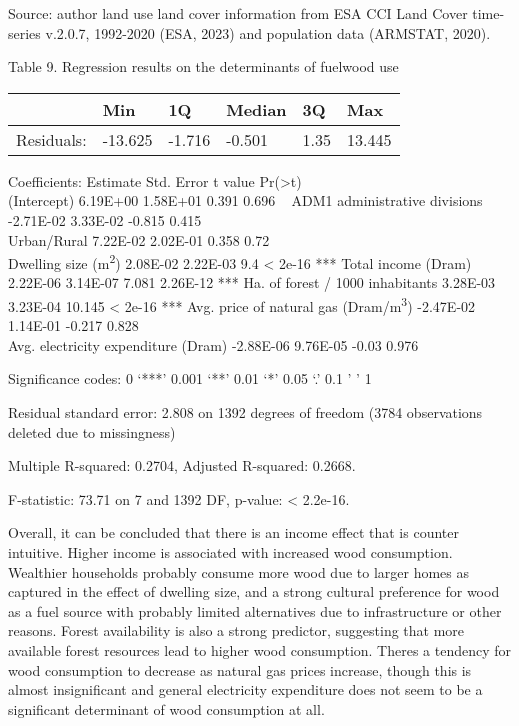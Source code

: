 \documentclass[
  letterpaper,
  DIV=11,
  numbers=noendperiod]{scrartcl}
\begin{document}
Source: author land use land cover information from ESA CCI Land Cover
time-series v.2.0.7, 1992-2020 (ESA, 2023) and population data (ARMSTAT,
2020).

\label{_Ref154854194}{}Table 9. Regression results on the
determinants of fuelwood use

\begin{longtable}[]{@{}llllll@{}}
\toprule\noalign{}
& Min & 1Q & Median & 3Q & Max \\
\midrule\noalign{}
\endhead
\bottomrule\noalign{}
\endlastfoot
Residuals: & -13.625 & -1.716 & -0.501 & 1.35 & 13.445 \\
\end{longtable}

Coefficients: Estimate Std. Error t value
Pr(\textgreater\textbar t\textbar)\\
(Intercept) 6.19E+00 1.58E+01 0.391 0.696 ~ ADM1 administrative
divisions -2.71E-02 3.33E-02 -0.815 0.415\\
Urban/Rural 7.22E-02 2.02E-01 0.358 0.72\\
Dwelling size (m\textsuperscript{2}) 2.08E-02 2.22E-03 9.4 \textless{}
2e-16 *** Total income (Dram) 2.22E-06 3.14E-07 7.081 2.26E-12 *** Ha.
of forest / 1000 inhabitants 3.28E-03 3.23E-04 10.145 \textless{} 2e-16
*** Avg. price of natural gas (Dram/m\textsuperscript{3}) -2.47E-02
1.14E-01 -0.217 0.828\\
Avg. electricity expenditure (Dram) -2.88E-06 9.76E-05 -0.03 0.976 ~

Significance codes: 0 `***' 0.001 `**' 0.01 `*' 0.05 `.' 0.1 ' ' 1

Residual standard error: 2.808 on 1392 degrees of freedom (3784
observations deleted due to missingness)

Multiple R-squared: 0.2704, Adjusted R-squared: 0.2668.

F-statistic: 73.71 on 7 and 1392 DF, p-value: \textless{} 2.2e-16.

Overall, it can be concluded that there is an income effect that is
counter intuitive. Higher income is associated with increased wood
consumption. Wealthier households probably consume more wood due to
larger homes as captured in the effect of dwelling size, and a strong
cultural preference for wood as a fuel source with probably limited
alternatives due to infrastructure or other reasons. Forest availability
is also a strong predictor, suggesting that more available forest
resources lead to higher wood consumption. There\textquotesingle s a
tendency for wood consumption to decrease as natural gas prices
increase, though this is almost insignificant and general electricity
expenditure does not seem to be a significant determinant of wood
consumption at all.
\end{document}
